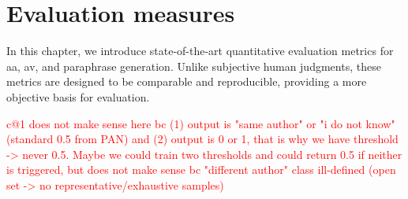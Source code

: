 \section{Evaluation measures}
\label{sec:evaluation_measures}

In this chapter, we introduce state-of-the-art quantitative evaluation metrics for \ac{aa}, \ac{av}, and paraphrase generation. 
Unlike subjective human judgments, these metrics are designed to be comparable and reproducible, providing a more objective basis for evaluation.

\textcolor{red}{
c@1 does not make sense here bc (1) output is "same author" or "i do not know" (standard 0.5 from PAN) and (2) output is 0 or 1, that is why we have threshold -> never 0.5. Maybe we could train two thresholds and could return 0.5 if neither is triggered, but does not make sense bc "different author" class ill-defined (open set -> no representative/exhaustive samples)
}




